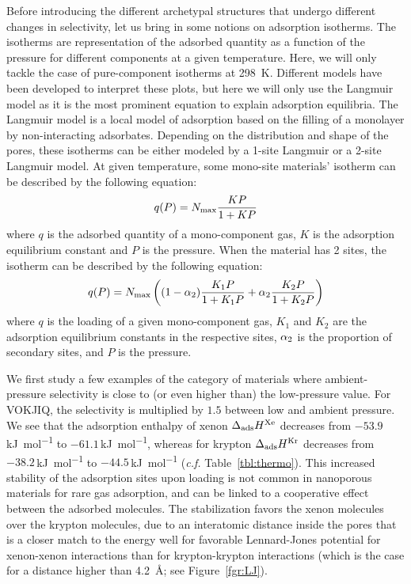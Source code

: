 \documentclass[main.tex]{subfiles}
\begin{document}
Before introducing the different archetypal structures that undergo different changes in selectivity, let us bring in some notions on adsorption isotherms. The isotherms are representation of the adsorbed quantity as a function of the pressure for different components at a given temperature. Here, we will only tackle the case of pure-component isotherms at \SI{298}{\kelvin}. Different models have been developed to interpret these plots,\cite{Al_Ghouti_2020} but here we will only use the Langmuir model as it is the most prominent equation to explain adsorption equilibria. The Langmuir model is a local model of adsorption based on the filling of a monolayer by non-interacting adsorbates. Depending on the distribution and shape of the pores, these isotherms can be either modeled by a 1-site Langmuir or a 2-site Langmuir model. At given temperature, some mono-site materials' isotherm can be described by the following equation:
\begin{equation}\label{eq:langmuir_1}
    q(P) = N_{\text{max}}\dfrac{KP}{1+KP}
\end{equation}
where $q$ is the adsorbed quantity of a mono-component gas, $K$ is the adsorption equilibrium constant and $P$ is the pressure. When the material has 2 sites, the isotherm can be described by the following equation:
\begin{equation}\label{eq:langmuir_2}
    q(P) = N_{\text{max}}\left((1-\alpha_{\text{2}})\dfrac{K_{\text{1}}P}{1+K_{\text{1}}P}+\alpha_{\text{2}}\dfrac{K_{\text{2}}P}{1+K_{\text{2}}P}\right)
\end{equation}
where $q$ is the loading of a given mono-component gas, $K_1$ and $K_2$ are the adsorption equilibrium constants in the respective sites, $\alpha_{\text{2}}$ is the proportion of secondary sites, and $P$ is the pressure.
  
We first study a few examples of the category of materials where ambient-pressure selectivity is close to (or even higher than) the low-pressure value. For VOKJIQ, the selectivity is multiplied by $1.5$ between low and ambient pressure. We see that the adsorption enthalpy of xenon $\Delta_{\text{ads}}H^{\text{Xe}}$ decreases from $-53.9$\,\si{\kilo\joule\per\mol} to $-61.1$\,\si{\kilo\joule\per\mol}, whereas for krypton $\Delta_{\text{ads}}H^{\text{Kr}}$ decreases from $-38.2$\,\si{\kilo\joule\per\mol} to $-44.5$\,\si{\kilo\joule\per\mol} (\emph{c.f.} Table~\ref{tbl:thermo}). This increased stability of the adsorption sites upon loading is not common in nanoporous materials for rare gas adsorption, and can be linked to a cooperative effect between the adsorbed molecules. The stabilization favors the xenon molecules over the krypton molecules, due to an interatomic distance inside the pores that is a closer match to the energy well for favorable Lennard-Jones potential for xenon-xenon interactions than for krypton-krypton interactions (which is the case for a distance higher than \SI{4.2}{\angstrom}; see Figure~\ref{fgr:LJ}).
\end{document}
